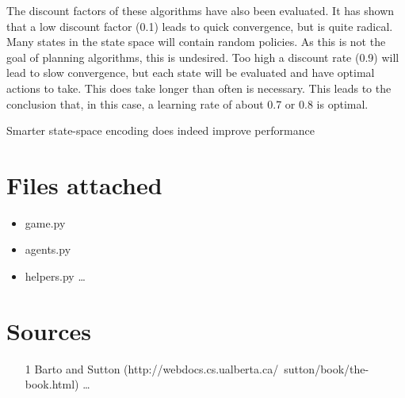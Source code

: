 \documentclass{article}
\begin{document}
The discount factors of these algorithms have also been evaluated. It has shown that a low discount factor (0.1) leads to quick convergence, but is quite radical. Many states in the state space will contain random policies. As this is not the goal of planning algorithms, this is undesired. Too high a discount rate (0.9) will lead to slow convergence, but each state will be evaluated and have optimal actions to take. This does take longer than often is necessary. This leads to the conclusion that, in this case, a learning rate of about 0.7 or 0.8 is optimal.

Smarter state-space encoding does indeed improve performance

\section*{Files attached}
\begin{itemize}
\item game.py
\item agents.py
\item helpers.py \ldots
\end{itemize}
\section*{Sources}

\begin{itemize}
	\item [1] Barto and Sutton (http://webdocs.cs.ualberta.ca/~sutton/book/the-book.html) \ldots
\end{itemize}
\end{document}
